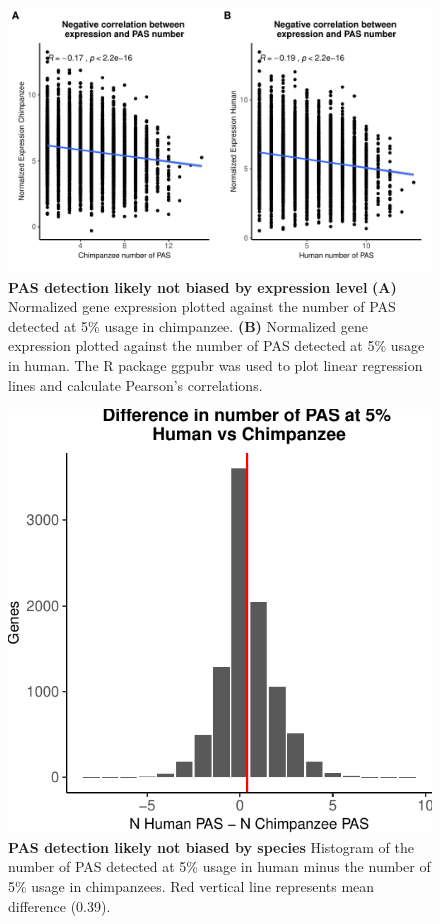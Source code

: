 \begin{figure}[!htb]
\centering
\includegraphics[width=5in]{img/ch03/Fig1-figSup5.pdf}
\caption[PAS detection likely not biased by expression level]{\textbf{PAS detection likely not biased by expression level} {\bf (A)}  Normalized gene expression plotted against the number of PAS detected at 5\% usage in chimpanzee. {\bf (B)}  Normalized gene expression plotted against the number of PAS detected at 5\% usage in human.  The R package ggpubr was used to plot linear regression lines and calculate Pearson's correlations.}
\label{fig:ch03-PASexp}
\end{figure}
\clearpage


\begin{figure}[!htb]
\centering
\includegraphics[width=5in]{img/ch03/Fig1-figSup6.pdf}
\caption[PAS detection likely not biased by species]{\textbf{PAS detection likely not biased by species} Histogram of the number of PAS detected at 5\% usage in human minus the number of 5\% usage in chimpanzees. Red vertical line represents mean difference (0.39).}
\label{fig:ch03-SpecPASnum}
\end{figure}
\clearpage



